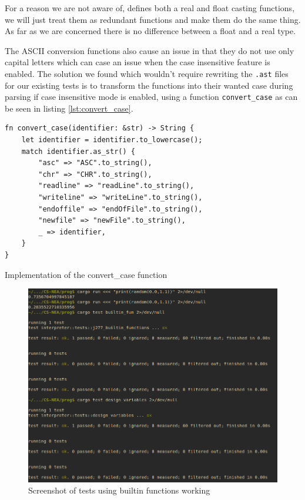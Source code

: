 \documentclass{article}
\begin{document}
For a reason we are not aware of,  defines both a real and
float casting functions, we will just treat them as redundant functions and
make them do the same thing. As far as we are concerned there is no difference
between a float and a real type.

The ASCII conversion functions also cause an issue in that they do not use only
capital letters which can case an issue when the case insensitive feature is
enabled. The solution we found which wouldn't require rewriting the
\texttt{.ast} files for our existing tests is to transform the functions into
their wanted case during parsing if case insensitive mode is enabled, using a
function \texttt{convert\_case} as can be seen in listing
\ref{lst:convert_case}.

\begin{listing}
	\begin{verbatim}
fn convert_case(identifier: &str) -> String {
    let identifier = identifier.to_lowercase();
    match identifier.as_str() {
        "asc" => "ASC".to_string(),
        "chr" => "CHR".to_string(),
        "readline" => "readLine".to_string(),
        "writeline" => "writeLine".to_string(),
        "endoffile" => "endOfFile".to_string(),
        "newfile" => "newFile".to_string(),
        _ => identifier,
    }
}
	\end{verbatim}
	\caption[Implementation of the convert\_case function]{Implementation of
	the convert\_case function}
	\label{lst:convert_case}
\end{listing}

\begin{figure}
	\includegraphics[width=\textwidth]{builtin_functions}
	\caption{Screenshot of tests using builtin functions working}
	\label{fig:builtin_functions}
\end{figure}
\end{document}

